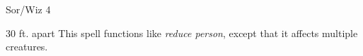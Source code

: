 
\begin{description*}
\item[Level:] Sor/Wiz 4
\end{description*}

30 ft. apart
This spell functions like \textit{reduce person}, except that it affects multiple
creatures.